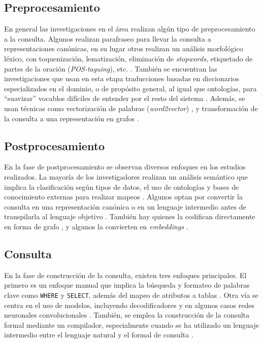 \subsection{Preprocesamiento} \label{neurosym_approach_preprocessing}

En general las investigaciones en el área realizan algún tipo de preprocesamiento a la consulta. Algunos realizan parafraseo para llevar la consulta a representaciones canónicas, en su lugar otros realizan un análisis morfológico léxico, con toquenización, lematización, eliminación de \textit{stopwords}, etiquetado de partes de la oración (\textit{POS-taguing}), etc. \cite{Singh2016Algorithm}. También se encuentran las investigaciones que usan en esta etapa traducciones basadas en diccionarios especializados en el dominio, o de propósito general, al igual que ontologías, para ``suavizar'' vocablos difíciles de entender por el resto del sistema \cite{Sathick2015Natural}. Además, se usan técnicas como vectorización de palabras (\textit{word2vector}) \cite{Wenhuchen}, y transformación de la consulta a una representación en grafos \cite{Cai2021SADGA}.

\subsection{Postprocesamiento} \label{neurosym_approach_postprocessing}

En la fase de postprocesamiento se observan diversos enfoques en los estudios realizados. La mayoría de los investigadores realizan un análisis semántico que implica la clasificación según tipos de datos, el uso de ontologías y bases de conocimiento externas para realizar mapeos \cite{Singh2016Algorithm}. Algunos optan por convertir la consulta en una representación canónica o en un lenguaje intermedio antes de transpilarla al lenguaje objetivo \cite{Nie2022GraphQ}. También hay quienes la codifican directamente en forma de grafo \cite{adrianbazaga2021}, y algunos la convierten en \textit{embeddings} \cite{Cai2021SADGA}.

\subsection{Consulta} \label{neurosym_approach_query}

En la fase de construcción de la consulta, existen tres enfoques principales. El primero es un enfoque manual que implica la búsqueda y formateo de palabras clave como \texttt{WHERE} y \texttt{SELECT}, además del mapeo de atributos a tablas \cite{Wenhuchen}. Otra vía se centra en el uso de modelos, incluyendo decodificadores y en algunos casos redes neuronales convolucionales \cite{Wu2021FromPT}. También, se emplea la construcción de la consulta formal mediante un compilador, especialmente cuando se ha utilizado un lenguaje intermedio entre el lenguaje natural y el formal de consulta \cite{Nie2022GraphQ}.

